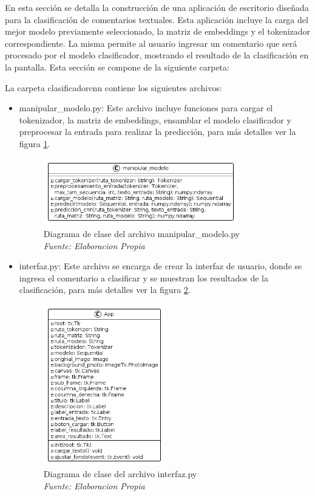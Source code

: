 En esta sección se detalla la construcción de una aplicación de escritorio diseñada para la clasificación de comentarios textuales. Esta aplicación incluye la carga del mejor modelo previamente seleccionado, la matriz de embeddings y el tokenizador correspondiente. La misma permite al usuario ingresar un comentario que será procesado por el modelo clasificador, mostrando el resultado de la clasificación en la pantalla. Esta sección se compone de la siguiente carpeta:

La carpeta clasificadorcnn contiene los siguientes archivos:

\begin{itemize}

\item manipular\_modelo.py: Este archivo incluye funciones para cargar el tokenizador, la matriz de embeddings, ensamblar el modelo clasificador y preprocesar la entrada para realizar la predicción, para más detalles ver la figura \ref{fig:uml12}.

\begin{figure}[h!]
	\includegraphics[width=0.8\textwidth]{capitulo5/figuras/fig12.png}
	\caption{Diagrama de clase del archivo manipular\_modelo.py
		\\\textit{Fuente: Elaboracion Propia}}
	\label{fig:uml12}
\end{figure}

\item interfaz.py: Este archivo se encarga de crear la interfaz de usuario, donde se ingresa el comentario a clasificar y se muestran los resultados de la clasificación, para más detalles ver la figura \ref{fig:uml13}.

\begin{figure}[h!]
	\includegraphics[width=0.5\textwidth]{capitulo5/figuras/fig13.png}
	\caption{Diagrama de clase del archivo interfaz.py
		\\\textit{Fuente: Elaboracion Propia}}
	\label{fig:uml13}
\end{figure}


\end{itemize}

